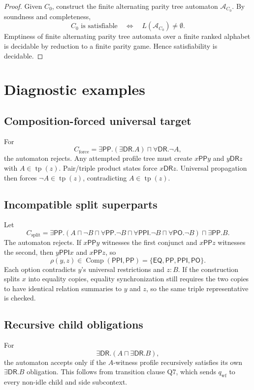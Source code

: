 \documentclass[11pt]{article}
\newcommand{\EQ}{\mathsf{EQ}}
\newcommand{\PP}{\mathsf{PP}}
\newcommand{\PPI}{\mathsf{PPI}}
\newcommand{\PO}{\mathsf{PO}}
\newcommand{\DR}{\mathsf{DR}}
\newcommand{\Comp}{\operatorname{Comp}}
\newcommand{\tp}{\operatorname{tp}}
\newcommand{\Aut}{\mathcal A}
\begin{document}
\begin{proof}
Given $C_0$, construct the finite alternating parity tree automaton $\Aut_{C_0}$.  By soundness and completeness,
\[
  C_0\text{ is satisfiable}
  \quad\Longleftrightarrow\quad
  L(\Aut_{C_0})\ne\emptyset.
\]
Emptiness of finite alternating parity tree automata over a finite ranked alphabet is decidable by reduction to a finite parity game.  Hence satisfiability is decidable.
\end{proof}

\section{Diagnostic examples}

\subsection{Composition-forced universal target}

For
\[
  C_{\mathrm{force}}
  =
  \exists\PP.(\exists\DR.A)\sqcap\forall\DR.\neg A,
\]
the automaton rejects.  Any attempted profile tree must create $x\PP y$ and $y\DR z$ with $A\in\tp(z)$.  Pair/triple product states force $x\DR z$.  Universal propagation then forces $\neg A\in\tp(z)$, contradicting $A\in\tp(z)$.

\subsection{Incompatible split superparts}

Let
\[
C_{\mathrm{split}}
=
\exists\PP.(A\sqcap\neg B\sqcap\forall\PP.\neg B\sqcap\forall\PPI.\neg B\sqcap\forall\PO.\neg B)
\sqcap
\exists\PP.B.
\]
The automaton rejects.  If $x\PP y$ witnesses the first conjunct and $x\PP z$ witnesses the second, then $y\PPI x$ and $x\PP z$, so
\[
  \rho(y,z)\in\Comp(\PPI,\PP)=\{\EQ,\PP,\PPI,\PO\}.
\]
Each option contradicts $y$'s universal restrictions and $z:B$.  If the construction splits $x$ into equality copies, equality synchronization still requires the two copies to have identical relation summaries to $y$ and $z$, so the same triple representative is checked.

\subsection{Recursive child obligations}

For
\[
  \exists\DR.(A\sqcap\exists\DR.B),
\]
the automaton accepts only if the $A$-witness profile recursively satisfies its own $\exists\DR.B$ obligation.  This follows from transition clause Q7, which sends $q_{\mathrm{wf}}$ to every non-idle child and side subcontext.
\end{document}
